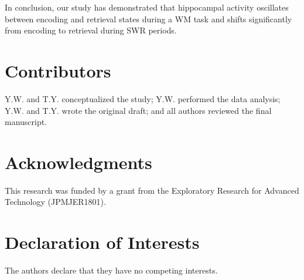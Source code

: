 \documentclass[final,3p,times,twocolumn]{elsarticle}
\begin{document}
In conclusion, our study has demonstrated that hippocampal activity oscillates between encoding and retrieval states during a WM task and shifts significantly from encoding to retrieval during SWR periods.

\label{sec:discussion}





% 

% 





\section*{Contributors}
Y.W. and T.Y. conceptualized the study; Y.W. performed the data analysis; Y.W. and T.Y. wrote the original draft; and all authors reviewed the final manuscript.
\label{contributors}

\section*{Acknowledgments}
This research was funded by a grant from the Exploratory Research for Advanced Technology (JPMJER1801).
\label{acknowledgments}

\section*{Declaration of Interests}
The authors declare that they have no competing interests.
\label{declaration of interests}
\end{document}
